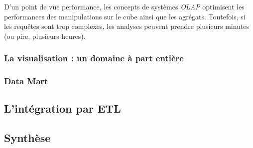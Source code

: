 D'un point de vue performance, les concepts de systèmes \textit{OLAP} optimisent les performances des manipulations sur le cube ainsi que les agrégats. Toutefois, si les requêtes sont trop complexes, les analyses peuvent prendre plusieurs minutes (ou pire, plusieurs heures).

\subsubsection{La visualisation : un domaine à part entière}


\subsubsection{Data Mart}

\subsection{L'intégration par ETL}\label{sec:rw:supervision:warehouse:etl}
\subsection{Synthèse}